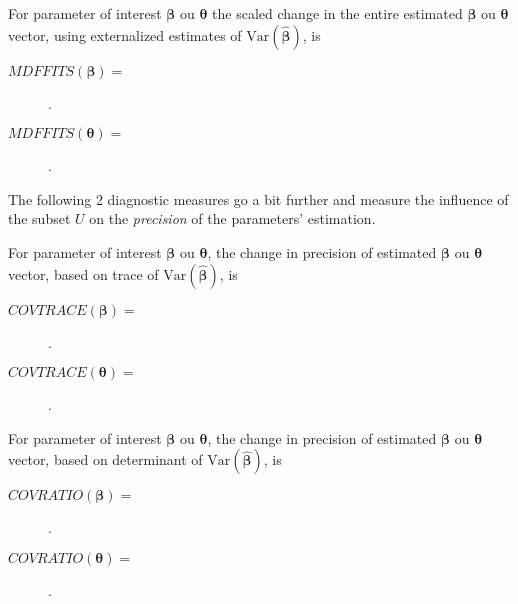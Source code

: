 \documentclass[english]{article}
\begin{document}
\begin{multicols*}{2}
\begin{definitionNOHFILLsub}
For parameter of interest $\bm{\beta}$ ou $\bm{\theta}$ the scaled change in the entire estimated $\bm{\beta}$ ou $\bm{\theta}$ vector, using externalized estimates of $\text{Var}(\hat{\bm{\beta}})$, is
\begin{description}
	\item[$MDFFITS(\bm{\beta}) =$]	.
	\item[$MDFFITS(\bm{\theta}) =$]	.
\end{description}
\end{definitionNOHFILLsub}

\bigskip

The following 2 diagnostic measures go a bit further and measure the influence of the subset $U$ on the \textit{precision} of the parameters' estimation.
\begin{definitionNOHFILLsub}
For parameter of interest $\bm{\beta}$ ou $\bm{\theta}$, the change in precision of estimated $\bm{\beta}$ ou $\bm{\theta}$ vector, based on trace of $\text{Var}(\hat{\bm{\beta}})$, is
\begin{description}
	\item[$COVTRACE(\bm{\beta}) =$]	.
	\item[$COVTRACE(\bm{\theta}) =$]	.
\end{description}
\end{definitionNOHFILLsub}

\begin{definitionNOHFILLsub}
For parameter of interest $\bm{\beta}$ ou $\bm{\theta}$, the change in precision of estimated $\bm{\beta}$ ou $\bm{\theta}$ vector, based on determinant of $\text{Var}(\hat{\bm{\beta}})$, is
\begin{description}
	\item[$COV RATIO(\bm{\beta}) =$]	.
	\item[$COV RATIO(\bm{\theta}) =$]		.
\end{description}
\end{definitionNOHFILLsub}


\end{multicols*}
\end{document}
